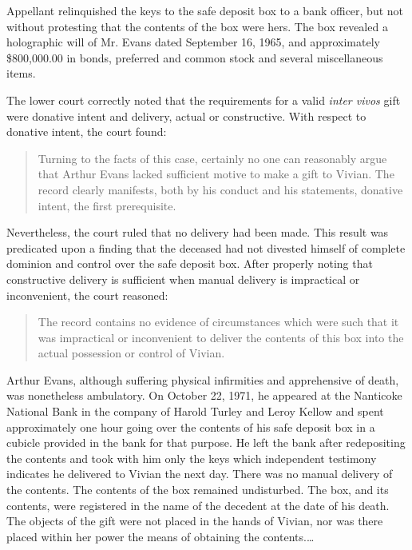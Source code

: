 Appellant relinquished the keys to the safe deposit box to a bank officer, but
not without protesting that the contents of the box were hers. The box revealed
a holographic will of Mr. Evans dated September 16, 1965, and approximately
\$800,000.00 in bonds, preferred and common stock and several miscellaneous
items.

The lower court correctly noted that the requirements for a valid \textit{inter
vivos} gift were donative intent and delivery, actual or constructive. With
respect to donative intent, the court found:
\begin{quote}
Turning to the facts of this case, certainly no one can reasonably argue that
Arthur Evans lacked sufficient motive to make a gift to Vivian. The record
clearly manifests, both by his conduct and his statements, donative intent, the
first prerequisite.
\end{quote}

Nevertheless, the court ruled that no delivery had been made. This result was
predicated upon a finding that the deceased had not divested himself of
complete dominion and control over the safe deposit box. After properly noting
that constructive delivery is sufficient when manual delivery is impractical or
inconvenient, the court reasoned:
\begin{quote}
The record contains no evidence of circumstances which were such that it was
impractical or inconvenient to deliver the contents of this box into the actual
possession or control of Vivian.
\end{quote}

Arthur Evans, although suffering physical infirmities and apprehensive of death,
was nonetheless ambulatory. On October 22, 1971, he appeared at the Nanticoke
National Bank in the company of Harold Turley and Leroy Kellow and spent
approximately one hour going over the contents of his safe deposit box in a
cubicle provided in the bank for that purpose. He left the bank after
redepositing the contents and took with him only the keys which independent
testimony indicates he delivered to Vivian the next day. There was no manual
delivery of the contents. The contents of the box remained undisturbed. The
box, and its contents, were registered in the name of the decedent at the date
of his death. The objects of the gift were not placed in the hands of Vivian,
nor was there placed within her power the means of obtaining the
contents.\ldots


